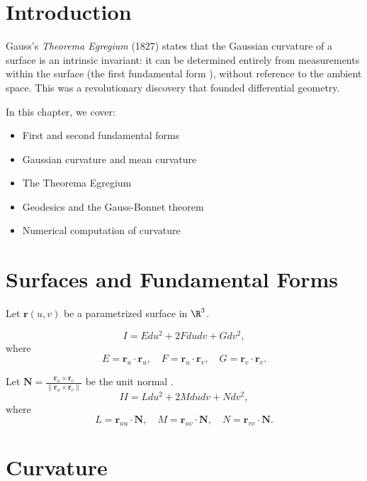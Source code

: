 \section{Introduction}

Gauss's \textit{Theorema Egregium } (1827) states that the Gaussian curvature  of a surface is an intrinsic invariant: it can be determined entirely from measurements within the surface (the first fundamental form ), without reference to the ambient space. This was a revolutionary discovery that founded differential geometry.

In this chapter, we cover:
\begin{itemize}
    \item First and second fundamental forms
    \item Gaussian curvature and mean curvature 
    \item The Theorema Egregium
    \item Geodesics and the Gauss-Bonnet  theorem
    \item Numerical computation of curvature
\end{itemize}

\section{Surfaces and Fundamental Forms}

Let $\mathbf{r}(u,v)$ be a parametrized surface  in $\R^3$.

\begin{definition}
\[
I = E du^2 + 2F du dv + G dv^2,
\]
where
\[
E = \mathbf{r}_u \cdot \mathbf{r}_u,\quad
F = \mathbf{r}_u \cdot \mathbf{r}_v,\quad
G = \mathbf{r}_v \cdot \mathbf{r}_v.
\]
\end{definition}

\begin{definition}
Let $\mathbf{N} = \frac{\mathbf{r}_u \times \mathbf{r}_v}{\|\mathbf{r}_u \times \mathbf{r}_v\|}$ be the unit normal .
\[
II = L du^2 + 2M du dv + N dv^2,
\]
where
\[
L = \mathbf{r}_{uu} \cdot \mathbf{N},\quad
M = \mathbf{r}_{uv} \cdot \mathbf{N},\quad
N = \mathbf{r}_{vv} \cdot \mathbf{N}.
\]
\end{definition}

\section{Curvature}

